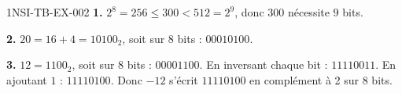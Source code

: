 \begin{corrige}{1NSI-TB-EX-002}
\textbf{1.} $2^8=256\leqslant300<512=2^9$, donc $300$ nécessite $9$ bits.

\textbf{2.} $20=16+4=10100_2$, soit sur 8 bits : $00010100$.

\textbf{3.} $12=1100_2$, soit sur 8 bits : $00001100$. En inversant chaque bit :
$11110011$. En ajoutant $1$ : $11110100$. Donc $-12$ s'écrit $11110100$ en complément à 2
sur 8 bits.
\end{corrige}

